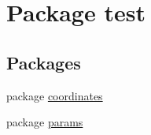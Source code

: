 \hypertarget{namespacetest}{}\section{Package test}
\label{namespacetest}
\subsection*{Packages}
\begin{DoxyCompactItemize}
\item 
package \hyperlink{namespacetest_1_1coordinates}{coordinates}
\item 
package \hyperlink{namespacetest_1_1params}{params}
\end{DoxyCompactItemize}
